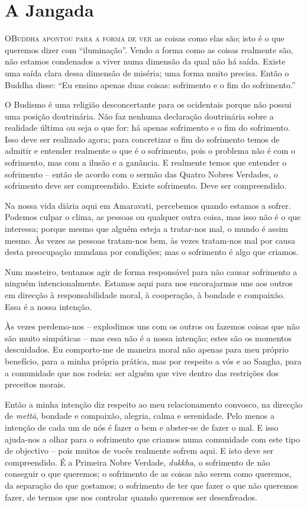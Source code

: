\chapter{A Jangada}

\lettrine{O}{\space Buddha apontou para a forma de ver} as coisas como elas são; isto é o que
queremos dizer com ``iluminação''. Vendo a forma como as coisas realmente são,
não estamos condenados a viver numa dimensão da qual não há saída. Existe uma
saída clara dessa dimensão de miséria; uma forma muito precisa. Então o Buddha
disse: ``Eu ensino apenas duas coisas: sofrimento e o fim do sofrimento.''

O Budismo é uma religião desconcertante para os ocidentais porque não possui uma
posição doutrinária. Não faz nenhuma declaração doutrinária sobre a realidade
última ou seja o que for: há apenas sofrimento e o fim do sofrimento. Isso deve
ser realizado agora; para concretizar o fim do sofrimento temos de admitir e
entender realmente o que é o sofrimento, pois o problema não é com o sofrimento,
mas com a ilusão e a ganância. E realmente temos que entender o sofrimento --
então de acordo com o sermão das Quatro Nobres Verdades, o sofrimento deve ser
compreendido. Existe sofrimento. Deve ser compreendido.

Na nossa vida diária aqui em Amaravati, percebemos quando estamos a sofrer.
Podemos culpar o clima, as pessoas ou qualquer outra coisa, mas isso não é o que
interessa; porque mesmo que alguém esteja a tratar-nos mal, o mundo é assim
mesmo. Às vezes as pessoas tratam-nos bem, às vezes tratam-nos mal por causa
desta preocupação mundana por condições; mas o sofrimento é algo que criamos.

Num mosteiro, tentamos agir de forma responsável para não causar sofrimento a
ninguém intencionalmente. Estamos aqui para nos encorajarmos uns aos outros em
direcção à responsabilidade moral, à cooperação, à bondade e compaixão. Essa é a
nossa intenção.

Às vezes perdemo-nos -- explodimos uns com os outros ou fazemos coisas que não
são muito simpáticas -- mas essa não é a nossa intenção; estes são os momentos
descuidados. Eu comporto-me de maneira moral não apenas para meu próprio
benefício, para a minha própria prática, mas por respeito a vós e ao Sangha,
para a comunidade que nos rodeia: ser alguém que vive dentro das restrições dos
preceitos morais.

Então a minha intenção diz respeito ao meu relacionamento convosco, na direcção
de \emph{mettā}, bondade e compaixão, alegria, calma e serenidade. Pelo menos a
intenção de cada um de nós é fazer o bem e abster-se de fazer o mal. E isso
ajuda-nos a olhar para o sofrimento que criamos numa comunidade com este tipo de
objectivo -- pois muitos de vocês realmente sofrem aqui. E isto deve ser
compreendido. É a Primeira Nobre Verdade, \emph{dukkha}, o sofrimento de não
conseguir o que queremos; o sofrimento de as coisas não serem como queremos, da
separação do que gostamos; o sofrimento de ter que fazer o que não queremos
fazer, de termos que nos controlar quando queremos ser desenfreados.

